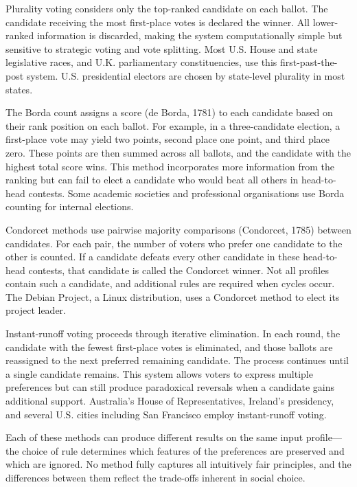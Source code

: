 Plurality voting considers only the top-ranked candidate on each ballot. The candidate receiving the most first-place votes is declared the winner. All lower-ranked information is discarded, making the system computationally simple but sensitive to strategic voting and vote splitting. Most U.S. House and state legislative races, and U.K. parliamentary constituencies, use this \QSOpen{}first-past-the-post\QSClose{} system. U.S. presidential electors are chosen by state-level plurality in most states.

The Borda count assigns a score (de Borda, 1781) to each candidate based on their rank position on each ballot. For example, in a three-candidate election, a first-place vote may yield two points, second place one point, and third place zero. These points are then summed across all ballots, and the candidate with the highest total score wins. This method incorporates more information from the ranking but can fail to elect a candidate who would beat all others in head-to-head contests. Some academic societies and professional organisations use Borda counting for internal elections.

Condorcet methods use pairwise majority comparisons (Condorcet, 1785) between candidates. For each pair, the number of voters who prefer one candidate to the other is counted. If a candidate defeats every other candidate in these head-to-head contests, that candidate is called the Condorcet winner. Not all profiles contain such a candidate, and additional rules are required when cycles occur. The Debian Project, a Linux distribution, uses a Condorcet method to elect its project leader.

Instant-runoff voting proceeds through iterative elimination. In each round, the candidate with the fewest first-place votes is eliminated, and those ballots are reassigned to the next preferred remaining candidate. The process continues until a single candidate remains. This system allows voters to express multiple preferences but can still produce paradoxical reversals when a candidate gains additional support. Australia’s House of Representatives, Ireland's presidency, and several U.S. cities including San Francisco employ instant-runoff voting.

Each of these methods can produce different results on the same input profile—the choice of rule determines which features of the preferences are preserved and which are ignored. No method fully captures all intuitively fair principles, and the differences between them reflect the trade-offs inherent in social choice.

